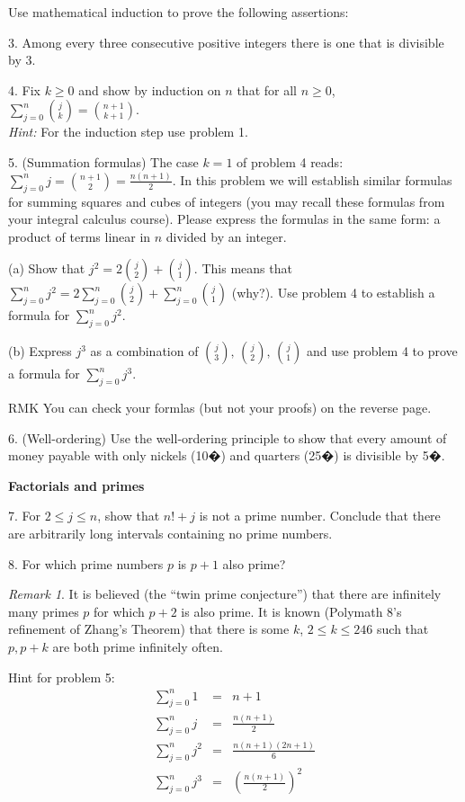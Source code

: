 \documentclass{amsart}
\newenvironment{lyxlist}[1]
{\begin{list}{}
{\settowidth{\labelwidth}{#1}
 \setlength{\leftmargin}{\labelwidth}
 \addtolength{\leftmargin}{\labelsep}
 \renewcommand{\makelabel}[1]{##1\hfil}}}
{\end{list}}
\theoremstyle{remark}
\newtheorem*{rem*}{\protect Remark}
\begin{document}
Use mathematical induction to prove the following assertions:
\begin{lyxlist}{10.}
\item [{3.}] Among every three consecutive positive integers there is one
that is divisible by $3$.\bigskip{}

\item [{4.}] Fix $k\geq0$ and show by induction on $n$ that for all $n\geq0$,
$\sum_{j=0}^{n}\binom{j}{k}=\binom{n+1}{k+1}$.\\
\emph{Hint:} For the induction step use problem 1.\bigskip{}

\item [{5.}] (Summation formulas) The case $k=1$ of problem 4 reads: $\sum_{j=0}^{n}j=\binom{n+1}{2}=\frac{n(n+1)}{2}$.
In this problem we will establish similar formulas for summing squares
and cubes of integers (you may recall these formulas from your integral
calculus course). Please express the formulas in the same form: a
product of terms linear in $n$ divided by an integer.

\begin{lyxlist}{10.}
\item [{(a)}] Show that $j^{2}=2\binom{j}{2}+\binom{j}{1}$. This means
that $\sum_{j=0}^{n}j^{2}=2\sum_{j=0}^{n}\binom{j}{2}+\sum_{j=0}^{n}\binom{j}{1}$
(why?). Use problem 4 to establish a formula for $\sum_{j=0}^{n}j^{2}$.
\item [{(b)}] Express $j^{3}$ as a combination of $\binom{j}{3},\,\binom{j}{2},\,\binom{j}{1}$
and use problem 4 to prove a formula for $\sum_{j=0}^{n}j^{3}$.
\item [{RMK}] You can check your formlas (but not your proofs) on the reverse
page.\bigskip{}

\end{lyxlist}
\item [{6.}] (Well-ordering) Use the well-ordering principle to show that
every amount of money payable with only nickels (10�) and quarters
(25�) is divisible by 5�.\bigskip{}

\end{lyxlist}
\begin{center}
\textbf{Factorials and primes}
\par\end{center}
\begin{lyxlist}{10.}
\item [{7.}] For $2\leq j\leq n$, show that $n!+j$ is not a prime number.
Conclude that there are arbitrarily long intervals containing no prime
numbers. \bigskip{}

\item [{8.}] For which prime numbers $p$ is $p+1$ also prime?\bigskip{}
\end{lyxlist}
\begin{rem*}
It is believed (the ``twin prime conjecture'') that there are infinitely
many primes $p$ for which $p+2$ is also prime. It is known (Polymath
8's refinement of Zhang's Theorem) that there is some $k$, $2\leq k\leq246$
such that $p,p+k$ are both prime infinitely often.
\end{rem*}
\newpage{}

Hint for problem 5:
\begin{eqnarray*}
\sum_{j=0}^{n}1 & = & n+1\\
\sum_{j=0}^{n}j & = & \frac{n(n+1)}{2}\\
\sum_{j=0}^{n}j^{2} & = & \frac{n(n+1)(2n+1)}{6}\\
\sum_{j=0}^{n}j^{3} & = & \left(\frac{n(n+1)}{2}\right)^{2}
\end{eqnarray*}
\end{document}
